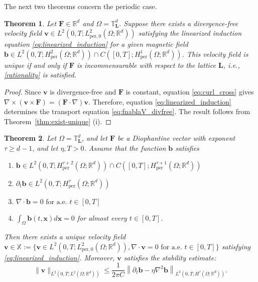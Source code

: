 \documentclass[12pt]{article}
\newtheorem{theorem}{Theorem}
\begin{document}
The next two theorems concern the periodic case.

\begin{theorem}\label{thm:main-theorem-uniqueness-torus}
Let $\mathbf{F} \in \mathbb{R}^d$ and $\Omega = \mathbb{T}^d_{\boldsymbol{L}}$. Suppose there exists a divergence-free velocity field $\boldsymbol{v} \in L^2(0,T; L^2_{\mathrm{per},0}(\Omega; \mathbb{R}^d))$ satisfying the linearized induction equation \eqref{eq:linearized_induction} for a given magnetic field $\boldsymbol{b} \in L^2(0,T; H^2_{\mathrm{per}}(\Omega;\mathbb{R}^d)) \cap C([0,T]; H^1_{\mathrm{per}}(\Omega;\mathbb{R}^d))$. This velocity field is unique if and only if $\mathbf{F}$ is incommensurable with respect to the lattice $\boldsymbol{L}$, i.e., \eqref{rationality} is satisfied.
\end{theorem}

\begin{proof}Since $\boldsymbol{v}$ is divergence-free and $\mathbf{F}$ is constant, equation \eqref{eq:curl_cross} gives $\nabla \times (\boldsymbol v\times \mathbf F) = (\mathbf F\cdot \nabla )\boldsymbol v$. Therefore, equation \eqref{eq:linearized_induction} determines the transport equation \eqref{eq:fnablaV_divfree}.
 The result follows from Theorem~\ref{thm:exist-unique} (i).
\end{proof}

		\begin{theorem}\label{main-theorem} Let $\Omega = \mathbb{T}^d_{\boldsymbol{L}}$, and let  $\mathbf{F}$ be a Diophantine vector with exponent $\tau\geq d-1$, and let $\eta, T>0$. Assume that the function $\boldsymbol{b}$ satisfies
        \begin{enumerate}
            \item $\boldsymbol{b} \in L^2(0,T;H^{\tau+2}_{\mathrm{per}}(\Omega; \mathbb{R}^d)) \cap C([0,T];H^{\tau+1}_{\mathrm{per}}(\Omega; \mathbb{R}^d))$
            \item $\partial_t \boldsymbol{b} \in L^2(0,T;H^\tau_{\mathrm{per}}(\Omega; \mathbb{R}^d))$
            \item $\nabla\cdot \boldsymbol{b}=0 \textrm{ for a.e. } t \in [0,T]$
            \item $\int_{\Omega}\boldsymbol{b}(t,\boldsymbol{x})d\boldsymbol{x}=0$ for almost every $t\in [0,T]$.
        \end{enumerate}
Then there exists a unique velocity field $\boldsymbol{v}\in \mathbb{X}:=\{\boldsymbol{v}\in L^2(0,T; L^2_{\mathrm{per},0}(\Omega; \mathbb{R}^d)), \nabla\cdot \boldsymbol{v}=0 \textrm{ for a.e. } t\in[0,T]\}$
        satisfying \eqref{eq:linearized_induction}.
         Moreover, $\boldsymbol{v}$ satisfies the stability estimate:$$ \|\boldsymbol{v}\|_{L^2(0,T; L^2(\Omega;\mathbb{R}^d))} \le \frac{1}{2\pi C} \left\| \partial_t \boldsymbol{b} - \eta \nabla^2 \boldsymbol{b} \right\|_{L^2(0,T; H^\tau(\Omega;\mathbb{R}^d))}. $$
         
          
		\end{theorem}
		
\end{document}
